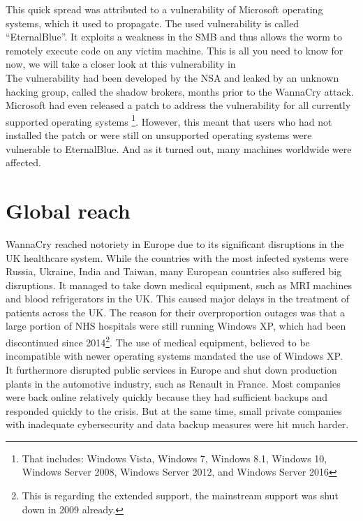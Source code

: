 This quick spread was attributed to a vulnerability of Microsoft operating systems, which it used to propagate.
The used vulnerability is called \enquote{EternalBlue}.
It exploits a weakness in the %
SMB and thus allows the worm to remotely execute code on any victim machine.
This is all you need to know for now, we will take a closer look at this vulnerability in %
\\

The vulnerability had been developed by the NSA and leaked by an unknown hacking group, called the %
shadow brokers, months prior to the WannaCry attack.
Microsoft had even released a patch to address the vulnerability for all currently supported operating systems
\footnote{That includes: Windows Vista, Windows 7, Windows 8.1, Windows 10, Windows Server 2008, Windows Server 2012, and Windows Server 2016}.
However, this meant that users who had not installed the patch or were still on unsupported operating systems were vulnerable to EternalBlue.
And as it turned out, many machines worldwide were affected.
\\

\section{Global reach}

WannaCry reached notoriety in Europe due to its significant disruptions in the UK healthcare system.
While the countries with the most infected systems were Russia, Ukraine, India and Taiwan, many European countries also suffered big disruptions.
It managed to take down medical equipment, such as MRI machines and blood refrigerators in the UK.
This caused major delays in the treatment of patients across the UK.
The reason for their overproportion outages was that a large portion of %
NHS hospitals were still running Windows XP, which had been discontinued since 2014\footnote{This is regarding the extended support, the mainstream support was shut down in 2009 already.}.
The use of medical equipment, believed to be incompatible with newer operating systems mandated the use of Windows XP.
\\

It furthermore disrupted public services in Europe and shut down production plants in the automotive industry, such as Renault in France.
Most companies were back online relatively quickly because they had sufficient backups and responded quickly to the crisis.
But at the same time, small private companies with inadequate cybersecurity and data backup measures were hit much harder.
\\

